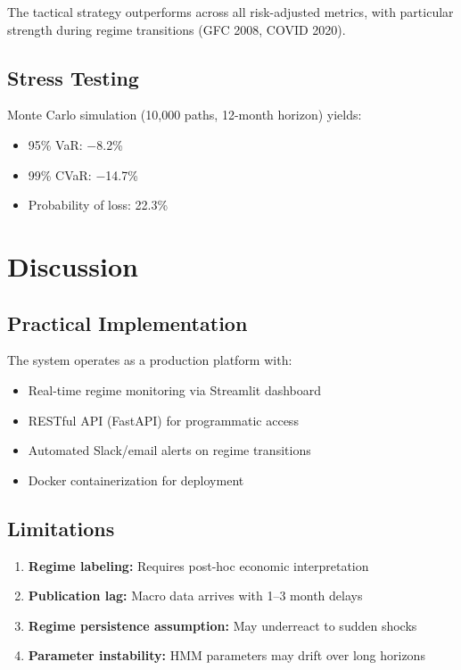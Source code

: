 \documentclass[12pt, a4paper]{article}
\begin{document}
The tactical strategy outperforms across all risk-adjusted metrics, with
particular strength during regime transitions (GFC 2008, COVID 2020).

\subsection{Stress Testing}

Monte Carlo simulation (10,000 paths, 12-month horizon) yields:
\begin{itemize}
    \item 95\% VaR: $-$8.2\%
    \item 99\% CVaR: $-$14.7\%
    \item Probability of loss: 22.3\%
\end{itemize}

\section{Discussion}

\subsection{Practical Implementation}

The system operates as a production platform with:
\begin{itemize}
    \item Real-time regime monitoring via Streamlit dashboard
    \item RESTful API (FastAPI) for programmatic access
    \item Automated Slack/email alerts on regime transitions
    \item Docker containerization for deployment
\end{itemize}

\subsection{Limitations}

\begin{enumerate}
    \item \textbf{Regime labeling:} Requires post-hoc economic interpretation
    \item \textbf{Publication lag:} Macro data arrives with 1--3 month delays
    \item \textbf{Regime persistence assumption:} May underreact to sudden shocks
    \item \textbf{Parameter instability:} HMM parameters may drift over long horizons
\end{enumerate}
\end{document}
